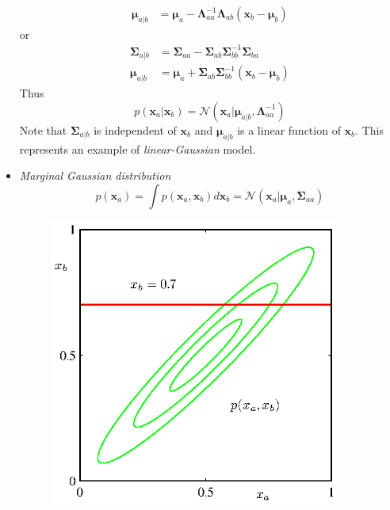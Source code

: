 \documentclass[12pt, a4paper]{article}
\begin{document}
\begin{itemize}
\begin{align}
            \bm{\mu}_{a\vert b}&=\bm{\mu}_a-\bm{\Lambda}_{aa}^{-1}\bm{\Lambda}_{ab}(\bm{x}_b-\bm{\mu}_b)
        \end{align}
        or
        \begin{align}
            \bm{\Sigma}_{a\vert b}&=\bm{\Sigma}_{aa}-\bm{\Sigma}_{ab}\bm{\Sigma}_{bb}^{-1}\bm{\Sigma}_{ba}\\
            \bm{\mu}_{a\vert b}&=\bm{\mu}_a+\bm{\Sigma}_{ab}\bm{\Sigma}_{bb}^{-1}(\bm{x}_b-\bm{\mu}_b)
        \end{align}
        Thus
        \begin{equation}
            p(\bm{x}_a|\bm{x}_b)=\mathcal{N}(\bm{x}_a|\bm{\mu}_{a|b},\bm{\Lambda}_{aa}^{-1})
        \end{equation}
        Note that $\bm{\Sigma}_{a\vert b}$ is independent of $\bm{x}_b$ and $\bm{\mu}_{a\vert b}$ is a linear
        function of $\bm{x}_b$. This represents an example of \textit{linear-Gaussian} model.
        \item \textit{Marginal Gaussian distribution}
        \begin{equation}
            p(\bm{x}_a)=\int p(\bm{x}_a,\bm{x}_b)d\bm{x}_b=\mathcal{N}(\bm{x}_a|\bm{\mu}_a,\bm{\Sigma}_{aa})
        \end{equation}
        \begin{figure}[htbp]
            \begin{minipage}[t]{0.45\textwidth}
                \centering
                \includegraphics[width=0.9\textwidth]{figures/Figure2_9a.eps}

\end{minipage}
\end{figure}
\end{itemize}
\end{document}
